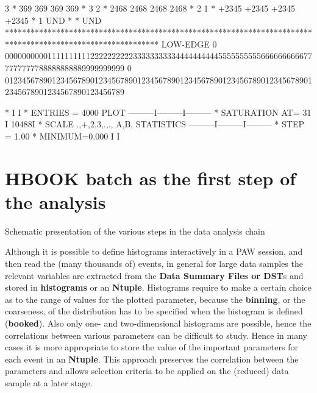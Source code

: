 \begin{Listing}
     3      *   369                      369                      369                      369                         *   3
     2      *   2468                     2468                     2468                     2468                        *   2
     1      *   +2345                    +2345                    +2345                    +2345                       *   1
   UND      *                                                                                                          * UND
            ************************************************************************************************************
 LOW-EDGE   0   0000000000111111111122222222223333333333444444444455555555556666666666777777777788888888889999999999
            0   0123456789012345678901234567890123456789012345678901234567890123456789012345678901234567890123456789
 
  *                                                          I         I
  * ENTRIES =     4000                   PLOT       ---------I---------I---------
  * SATURATION  AT=           31                             I    10488I
  * SCALE  .,+,2,3,.,., A,B,           STATISTICS   ---------I---------I---------
  * STEP = 1.00     * MINIMUM=0.000                          I         I
\end{Listing}

\newpage%

\section{HBOOK batch as the first step of the analysis}

\begin{Fighere}
\begin{center}\mbox{}\end{center}
\caption{Schematic presentation of the various steps in the data analysis chain}
\label{FBATCH}
\end{Fighere}

Although it is possible to define histograms interactively in a PAW
session, and then read the (many thousands of) events, in general
for large data samples the relevant variables are extracted from
the {\bf Data Summary Files {\rm or} DST}s
and stored in {\bf histograms}
or an {\bf Ntuple}.
Histograms require to make a certain choice 
as to the range of values for the plotted parameter, because the
{\bf binning}, or the coarseness, of the distribution has to
be specified when the histogram is defined ({\bf booked}).
Also only one- and two-dimensional histograms are possible, hence the
correlations between various parameters can be difficult to study.
Hence in many cases it is more appropriate to store the value of
the important parameters for each event in an {\bf Ntuple}.
This approach preserves the correlation between the parameters
and allows selection criteria to be applied on the (reduced)
data sample at a later stage.

